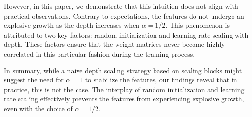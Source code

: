 However, in this paper, we demonstrate that this intuition does not align with practical observations. Contrary to expectations, the features do not undergo an explosive growth as the depth increases when $\alpha = 1/2$. This phenomenon is attributed to two key factors: random initialization and learning rate scaling with depth. These factors ensure that the weight matrices never become highly correlated in this particular fashion during the training process.

In summary, while a naive depth scaling strategy based on scaling blocks might suggest the need for $\alpha=1$ to stabilize the features, our findings reveal that in practice, this is not the case. The interplay of random initialization and learning rate scaling effectively prevents the features from experiencing explosive growth, even with the choice of $\alpha = 1/2$.

